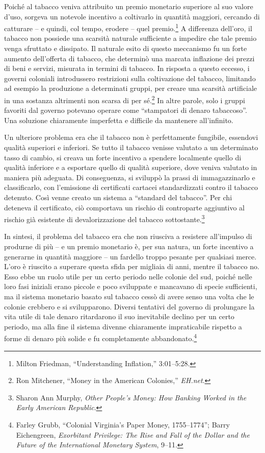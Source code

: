 \documentclass[
  a5paper,
  smalldemyvopaper,10pt,twoside,onecolumn,openright,extrafontsizes,hidelinks]{memoir}
\begin{document}
Poiché al tabacco veniva attribuito un premio monetario superiore al suo
valore d'uso, sorgeva un notevole incentivo a coltivarlo in quantità
maggiori, cercando di catturare -- e quindi, col tempo, erodere -- quel
premio.\footnote{Milton Friedman, ``Understanding Inflation,''
  3:01--5:28.} A differenza dell'oro, il tabacco non possiede una
scarsità naturale sufficiente a impedire che tale premio venga sfruttato
e dissipato. Il naturale esito di questo meccanismo fu un forte aumento
dell'offerta di tabacco, che determinò una marcata inflazione dei prezzi
di beni e servizi, misurata in termini di tabacco. In risposta a questo
eccesso, i governi coloniali introdussero restrizioni sulla coltivazione
del tabacco, limitando ad esempio la produzione a determinati gruppi,
per creare una scarsità artificiale in una sostanza altrimenti non
scarsa di per sé.\footnote{Ron Mitchener, ``Money in the American
  Colonies,'' \emph{EH.net}.} In altre parole, solo i gruppi favoriti
dal governo potevano operare come ``stampatori di denaro tabaccoso''.
Una soluzione chiaramente imperfetta e difficile da mantenere
all'infinito.

Un ulteriore problema era che il tabacco non è perfettamente fungibile,
essendovi qualità superiori e inferiori. Se tutto il tabacco venisse
valutato a un determinato tasso di cambio, si creava un forte incentivo
a spendere localmente quello di qualità inferiore e a esportare quello
di qualità superiore, dove veniva valutato in maniera più adeguata. Di
conseguenza, si sviluppò la prassi di immagazzinarlo e classificarlo,
con l'emissione di certificati cartacei standardizzati contro il tabacco
detenuto. Così venne creato un sistema a ``standard del tabacco''. Per
chi deteneva il certificato, ciò comportava un rischio di controparte
aggiuntivo al rischio già esistente di devalorizzazione del tabacco
sottostante.\footnote{Sharon Ann Murphy, \emph{Other People's Money: How
  Banking Worked in the Early American Republic}.}

In sintesi, il problema del tabacco era che non riusciva a resistere
all'impulso di produrne di più -- e un premio monetario è, per sua
natura, un forte incentivo a generarne in quantità maggiore -- un
fardello troppo pesante per qualsiasi merce. L'oro è riuscito a superare
questa sfida per migliaia di anni, mentre il tabacco no. Esso ebbe un
ruolo utile per un certo periodo nelle colonie del sud, poiché nelle
loro fasi iniziali erano piccole e poco sviluppate e mancavano di specie
sufficienti, ma il sistema monetario basato sul tabacco cessò di avere
senso una volta che le colonie crebbero e si svilupparono. Diversi
tentativi del governo di prolungare la vita utile di tale denaro
ritardarono il suo inevitabile declino per un certo periodo, ma alla
fine il sistema divenne chiaramente impraticabile rispetto a forme di
denaro più solide e fu completamente abbandonato.\footnote{Farley Grubb,
  ``Colonial Virginia's Paper Money, 1755--1774''; Barry Eichengreen,
  \emph{Exorbitant Privilege: The Rise and Fall of the Dollar and the
  Future of the International Monetary System}, 9--11.}
\end{document}
